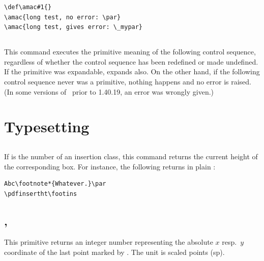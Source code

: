 \documentclass{pdftexmanual}
\begin{document}
\begin{verbatim}
\def\amac#1{}
\amac{long test, no error: \par}
\amac{long test, gives error: \_mypar}
\end{verbatim}


\subsection{}

This command executes the primitive meaning of the following control
sequence, regardless of whether the control sequence has been redefined
or made undefined. If the primitive was expandable, 
expands also. On the other hand, if the following control sequence never
was a primitive, nothing happens and no error is raised. (In some
versions of \PDFTEX\ prior to 1.40.19, an error was wrongly given.)

\section{Typesetting}

\subsection{}

If  is the number of an insertion class, this command
returns the current height of the corresponding box. For instance, the
following returns \type{12pt} in plain \TEX:

\begin{verbatim}
Abc\footnote*{Whatever.}\par
\pdfinsertht\footins
\end{verbatim}

\subsection{, }

This primitive returns an integer number representing the absolute $x$
resp.\ $y$ coordinate of the last point marked by . The
unit is scaled points (sp).
\end{document}
